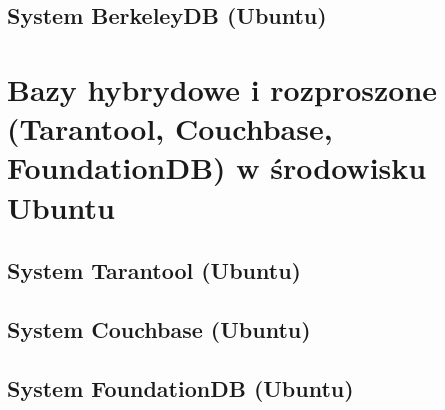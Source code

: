 \subsection{System BerkeleyDB (Ubuntu)}





\clearpage

\section{Bazy hybrydowe i rozproszone (Tarantool, Couchbase, FoundationDB) w środowisku Ubuntu}

\subsection{System Tarantool (Ubuntu)}





\clearpage

\subsection{System Couchbase (Ubuntu)}





\clearpage

\subsection{System FoundationDB (Ubuntu)}





\clearpage
